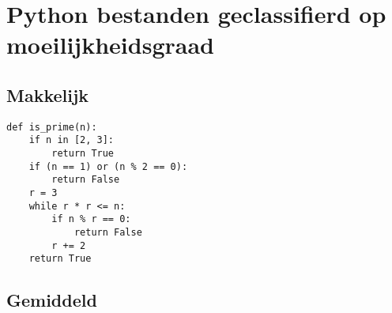 \section{Python bestanden geclassifierd op moeilijkheidsgraad}
\label{bijlage:bestanden-moeilijkheidsgraad}

\subsection{Makkelijk}
\label{bijlage:makkelijk}

\begin{verbatim}
def is_prime(n):
    if n in [2, 3]:
        return True
    if (n == 1) or (n % 2 == 0):
        return False
    r = 3
    while r * r <= n:
        if n % r == 0:
            return False
        r += 2
    return True
\end{verbatim}

\subsection{Gemiddeld}
\label{bijlage:gemiddeld}

